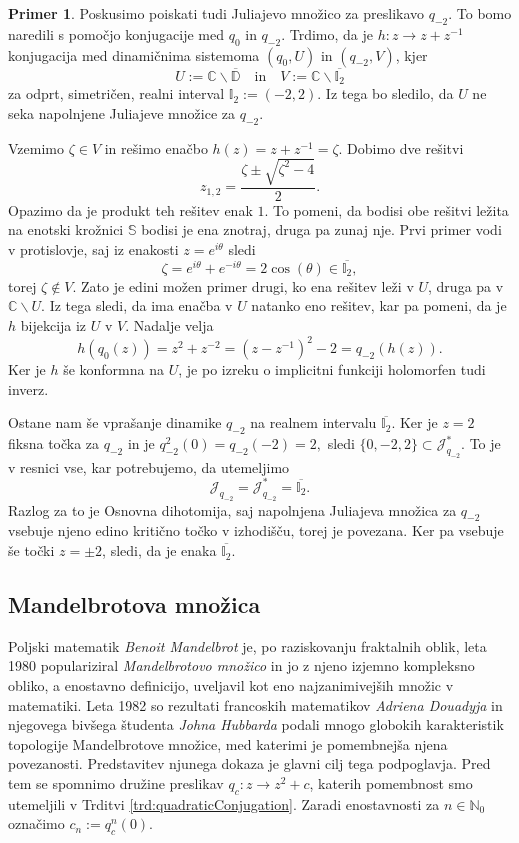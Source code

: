 \documentclass[12pt,a4paper]{amsart}
\theoremstyle{definition} %
\newtheorem{primer}[definicija]{Primer}
\theoremstyle{plain} %
\newcommand{\N}{\mathbb N}
\newcommand{\CC}{\mathbb C}
\newcommand{\D}{\mathbb D} %
\newcommand{\SSS}{\mathbb S} %
\newcommand{\I}{\mathbb I} %
\newcommand{\J}{\mathscr J} %
\begin{document}
\begin{primer}
Poskusimo poiskati tudi Juliajevo množico za preslikavo $q_{-2}$.
To bomo naredili s pomočjo konjugacije med $q_0$ in $q_{-2}$. 
Trdimo, da je $h \colon z \to z + z^{-1}$
konjugacija med dinamičnima sistemoma $(q_0, U)$ in $(q_{-2}, V)$, kjer
$$U := \CC \smallsetminus \overline{\D} \quad \text{in} \quad V := \CC \smallsetminus \overline{\I_2}$$
za odprt, simetričen, realni interval $\I_2 := (-2, 2)$.
Iz tega bo sledilo, da $U$ ne seka napolnjene Juliajeve množice za $q_{-2}$.

Vzemimo $\zeta \in V$ in rešimo enačbo $h(z) = z + z^{-1} = \zeta .$
Dobimo dve rešitvi
$$z_{1, 2} = \frac{\zeta \pm \sqrt{\zeta^2 - 4}}{2}.$$
Opazimo da je produkt teh rešitev enak $1$. 
To pomeni, da bodisi obe rešitvi ležita na enotski krožnici $\SSS$ bodisi je ena znotraj, druga pa zunaj nje. 
Prvi primer vodi v protislovje, saj iz enakosti $z = e^{i\theta}$ sledi 
$$\zeta = e^{i\theta} + e^{-i\theta} = 2\cos(\theta) \in \overline{\I_2},$$
torej $\zeta \notin V$. 
Zato je edini možen primer drugi, ko ena rešitev leži v $U$, druga pa v $\CC \smallsetminus U$.
Iz tega sledi, da ima enačba v $U$ natanko eno rešitev, kar pa pomeni, da je $h$ bijekcija iz $U$ v $V$.
Nadalje velja 
$$h(q_0(z)) = z^2 + z^{-2} = (z - z^{-1})^2 - 2 = q_{-2}(h(z)).$$
Ker je $h$ še konformna na $U$, je po izreku o implicitni funkciji holomorfen tudi inverz.

Ostane nam še vprašanje dinamike $q_{-2}$ na realnem intervalu $\overline{\I_2}$.
Ker je $z=2$ fiksna točka za $q_{-2}$ in je 
$q^2_{-2}(0) = q_{-2}(-2) = 2,$
sledi $\{0, -2, 2\} \subset \J_{q_{-2}}^\ast.$
To je v resnici vse, kar potrebujemo, da utemeljimo
$$\J_{q_{-2}} = \J^\ast_{q_{-2}} = \overline{\I_2}.$$
Razlog za to je Osnovna dihotomija, saj napolnjena Juliajeva množica za $q_{-2}$ vsebuje njeno edino kritično točko v izhodišču,
torej je povezana. Ker pa vsebuje še točki $z = \pm 2$, sledi, da je enaka $\overline{\I_2}$.
\end{primer}



\subsection{Mandelbrotova množica}
Poljski matematik {\em Benoit Mandelbrot} je, po raziskovanju fraktalnih oblik, leta 1980 populariziral 
{\em Mandelbrotovo množico} in jo z njeno izjemno kompleksno obliko,
a enostavno definicijo, uveljavil kot eno najzanimivejših množic v matematiki.
Leta 1982 so rezultati francoskih matematikov {\em Adriena Douadyja} in njegovega bivšega študenta {\em Johna Hubbarda}
podali mnogo globokih karakteristik topologije Mandelbrotove množice, med katerimi je pomembnejša njena povezanosti.
Predstavitev njunega dokaza je glavni cilj tega podpoglavja. 
Pred tem se spomnimo družine preslikav $q_c \colon z \to z^2 + c$, katerih pomembnost smo utemeljili v Trditvi \ref{trd:quadraticConjugation}.
Zaradi enostavnosti za $n\in\N_0$ označimo $c_n := q_c^n(0)$.
\end{document}
